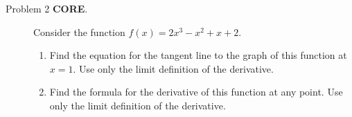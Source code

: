 \documentclass[addpoints]{exam}
\begin{document}
\begin{description}

	\item[Problem 2 \textbf{CORE}.] Consider the function $f(x) = 2x^3 - x^2 + x + 2$. 
		\begin{enumerate}
		\item Find the equation for the tangent line to the graph of this function at $x = 1$. Use only the limit definition of the derivative. 
		\item Find the formula for the derivative of this function at any point. Use only the limit definition of the derivative. 
		\end{enumerate}


\hrulefill




\end{description}
\end{document}
